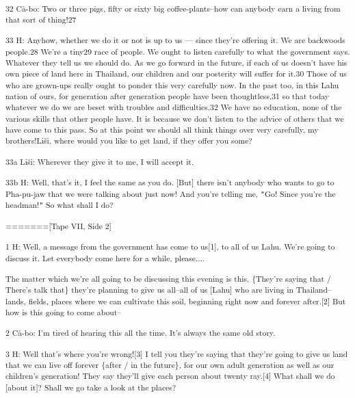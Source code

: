 {\textsuperscript{32 Cà-bo: Two or three pigs, fifty or sixty big coffee-plants--how
can anybody earn a living from that sort of thing!27}}

{\textsuperscript{33 H: Anyhow, whether we do it or not is up to us ---
since they're offering it. We are backwoods people.28 We're a tiny29 race of people.
We ought to listen carefully to what the government says. Whatever they tell us
we should do. As we go forward in the future, if each of us doesn't have his own
piece of land here in Thailand, our children and our posterity will suffer for
it.30 Those of us who are grown-ups really ought to ponder this very carefully
now. In the past too, in this Lahu nation of ours, for generation after generation
people have been thoughtless,31 so that today whatever we do we are beset with
troubles and difficulties.32 We have no education, none of the various skills that
other people have. It is because we don't listen to the advice of others that we
have come to this pass. So at this point we should all think things over very carefully,
my brothers!Liši, where would you like to get land, if they offer you some?}}

{\textsuperscript{33a Liši: Wherever they give it to me, I will accept
it.}}

{\textsuperscript{33b H: Well, that's it, I feel the same as you do. [But]
there isn't anybody who wants to go to Pha-pu-jaw that we were talking about just
now! And you're telling me, \texttt{"}Go! Since you're the headman!\texttt{"} So
what shall I do? }}

{\textsuperscript{=======[Tape VII, Side 2]}}

{\textsuperscript{1 H: Well, a message from the government has come to us[1],
to all of us Lahu. We're going to discuss it. Let everybody come here for a while,
please.... }}

{\textsuperscript{The matter which we're all going to be discussing this
evening is this. \{They're saying that / There's talk that\} they're planning to
give us all--all of us [Lahu] who are living in Thailand--lands, fields, places
where we can cultivate this soil, beginning right now and forever after.[2] But
how is this going to come about--}}

{\textsuperscript{2 Cà-bo: I'm tired of hearing this all the time. It's
always the same old story. }}

{\textsuperscript{3 H: Well that's where you're wrong![3] I tell you they're
saying that they're going to give us land that we can live off forever \{after
/ in the future\}, for our own adult generation as well as our children's generation!
They say they'll give each person about twenty ray.[4] What shall we do [about
it]? Shall we go take a look at the places? }}

